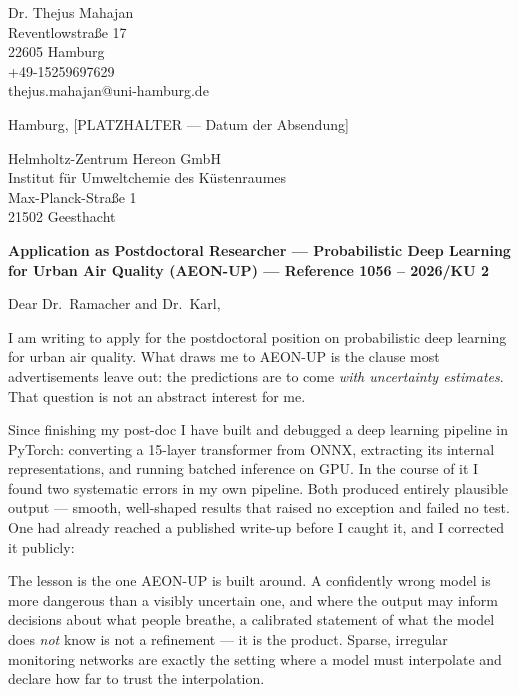 \documentclass[11pt, a4paper]{article}
\begin{document}
\pagestyle{empty}

\begin{flushleft}
Dr. Thejus Mahajan\\
Reventlowstra{\ss}e 17\\
22605 Hamburg\\
+49-15259697629\\
thejus.mahajan@uni-hamburg.de
\end{flushleft}

\vspace{0.15cm}

\begin{flushright}
Hamburg, [PLATZHALTER --- Datum der Absendung]
\end{flushright}

\vspace{0.15cm}

\begin{flushleft}
Helmholtz-Zentrum Hereon GmbH\\
Institut f\"ur Umweltchemie des K\"ustenraumes\\
Max-Planck-Stra{\ss}e 1\\
21502 Geesthacht
\end{flushleft}

\vspace{0.15cm}

\textbf{Application as Postdoctoral Researcher --- Probabilistic Deep Learning
for Urban Air Quality (AEON-UP) --- Reference 1056 -- 2026/KU 2}

\vspace{0.3em}
Dear Dr.~Ramacher and Dr.~Karl,


I am writing to apply for the postdoctoral position on probabilistic deep
learning for urban air quality. What draws me to AEON-UP is the clause most
advertisements leave out: the predictions are to come \emph{with uncertainty
estimates}. That question is not an abstract interest for me.

Since finishing my post-doc I have built and debugged a deep learning pipeline
in PyTorch: converting a 15-layer transformer from ONNX, extracting its internal
representations, and running batched inference on GPU. In the course of it I
found two systematic errors in my own pipeline. Both produced entirely plausible
output --- smooth, well-shaped results that raised no exception and failed no
test. One had already reached a published write-up before I caught it, and I
corrected it publicly:

The lesson is the one AEON-UP is built around. A confidently wrong model is more
dangerous than a visibly uncertain one, and where the output may inform decisions
about what people breathe, a calibrated statement of what the model does
\emph{not} know is not a refinement --- it is the product. Sparse, irregular
monitoring networks are exactly the setting where a model must interpolate and
declare how far to trust the interpolation.
\end{document}
